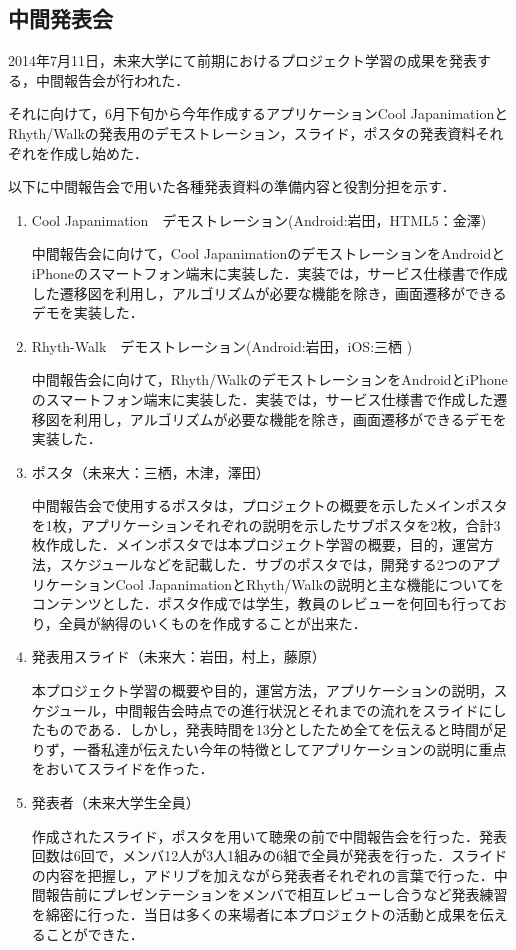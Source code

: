 \subsection{中間発表会}
\par
2014年7月11日，未来大学にて前期におけるプロジェクト学習の成果を発表する，中間報告会が行われた．
\par
それに向けて，6月下旬から今年作成するアプリケーションCool JapanimationとRhyth/Walkの発表用のデモストレーション，スライド，ポスタの発表資料それぞれを作成し始めた．
\par
以下に中間報告会で用いた各種発表資料の準備内容と役割分担を示す．
\begin{enumerate}
\item
Cool Japanimation　デモストレーション(Android:岩田，HTML5：金澤)
\par 中間報告会に向けて，Cool JapanimationのデモストレーションをAndroidとiPhoneのスマートフォン端末に実装した．実装では，サービス仕様書で作成した遷移図を利用し，アルゴリズムが必要な機能を除き，画面遷移ができるデモを実装した．
\item Rhyth-Walk　デモストレーション(Android:岩田，iOS:三栖 )
\par
中間報告会に向けて，Rhyth/WalkのデモストレーションをAndroidとiPhoneのスマートフォン端末に実装した．実装では，サービス仕様書で作成した遷移図を利用し，アルゴリズムが必要な機能を除き，画面遷移ができるデモを実装した．
\item ポスタ（未来大：三栖，木津，澤田）
\par
中間報告会で使用するポスタは，プロジェクトの概要を示したメインポスタを1枚，アプリケーションそれぞれの説明を示したサブポスタを2枚，合計3枚作成した．メインポスタでは本プロジェクト学習の概要，目的，運営方法，スケジュールなどを記載した．サブのポスタでは，開発する2つのアプリケーションCool JapanimationとRhyth/Walkの説明と主な機能についてをコンテンツとした．ポスタ作成では学生，教員のレビューを何回も行っており，全員が納得のいくものを作成することが出来た．
\item 発表用スライド（未来大：岩田，村上，藤原）
\par
本プロジェクト学習の概要や目的，運営方法，アプリケーションの説明，スケジュール，中間報告会時点での進行状況とそれまでの流れをスライドにしたものである．しかし，発表時間を13分としたため全てを伝えると時間が足りず，一番私達が伝えたい今年の特徴としてアプリケーションの説明に重点をおいてスライドを作った．
\item 発表者（未来大学生全員）
\par
作成されたスライド，ポスタを用いて聴衆の前で中間報告会を行った．発表回数は6回で，メンバ12人が3人1組みの6組で全員が発表を行った．スライドの内容を把握し，アドリブを加えながら発表者それぞれの言葉で行った．中間報告前にプレゼンテーションをメンバで相互レビューし合うなど発表練習を綿密に行った．当日は多くの来場者に本プロジェクトの活動と成果を伝えることができた．

\end{enumerate}

